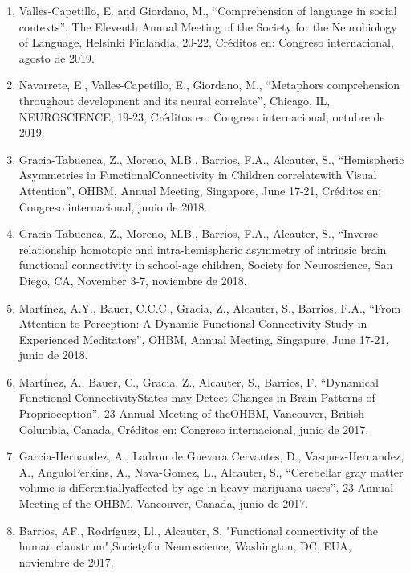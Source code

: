 \begin{enumerate}
\item Valles-Capetillo, E. and Giordano, M., “Comprehension of language in social contexts”, The Eleventh Annual Meeting of the Society for 
the 
Neurobiology of Language, Helsinki Finlandia, 20-22, Créditos en: Congreso internacional, agosto de 2019.

\item Navarrete, E., Valles-Capetillo, E., Giordano, M., “Metaphors comprehension throughout development and its neural correlate”, Chicago, 
IL, 
NEUROSCIENCE, 19-23, Créditos en: Congreso internacional, octubre de 2019.

\item Gracia-Tabuenca, Z., Moreno, M.B., Barrios, F.A., Alcauter, S., “Hemispheric Asymmetries in FunctionalConnectivity in Children 
correlatewith 
Visual Attention”, OHBM, Annual Meeting, Singapore, June 17-21, Créditos en: Congreso internacional, junio de 2018.

\item Gracia-Tabuenca, Z., Moreno, M.B., Barrios, F.A., Alcauter, S., “Inverse relationship homotopic and intra-hemispheric asymmetry of 
intrinsic 
brain functional connectivity in school-age children, Society for Neuroscience, San Diego, CA, November 3-7, noviembre de 2018.

\item Martínez, A.Y., Bauer, C.C.C., Gracia, Z., Alcauter, S., Barrios, F.A., “From Attention to Perception: A Dynamic Functional 
Connectivity 
Study in Experienced Meditators”, OHBM, Annual Meeting, Singapure, June 17-21, junio de 2018.

\item Martínez, A., Bauer, C., Gracia, Z., Alcauter, S., Barrios, F. “Dynamical Functional ConnectivityStates may Detect Changes in Brain 
Patterns 
of Proprioception”, 23 Annual Meeting of theOHBM, Vancouver, British Columbia, Canada, Créditos en: Congreso internacional, junio de 2017.

\item Garcia-Hernandez, A., Ladron de Guevara Cervantes, D., Vasquez-Hernandez, A., AnguloPerkins, A., Nava-Gomez, L., Alcauter, S., 
“Cerebellar 
gray matter volume is differentiallyaffected by age in heavy marijuana users”, 23 Annual Meeting of the OHBM, Vancouver, Canada, junio de 
2017.

\item Barrios, AF., Rodríguez, Ll., Alcauter, S, "Functional connectivity of the human claustrum",Societyfor Neuroscience, Washington, DC, 
EUA, 
noviembre de 2017.


\end{enumerate}
